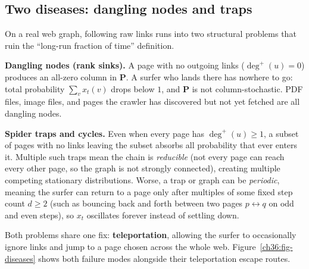 \subsection{Two diseases: dangling nodes and traps}

On a real web graph, following raw links runs into two structural problems that ruin the ``long-run fraction of time'' definition.

\begin{trapbox}
\textbf{Dangling nodes (rank sinks).} A page with no outgoing links ($\deg^+(u)=0$) produces an all-zero column in $\mathbf{P}$. A surfer who lands there has nowhere to go: total probability $\sum_v x_t(v)$ drops below $1$, and $\mathbf{P}$ is not column-stochastic. PDF files, image files, and pages the crawler has discovered but not yet fetched are all dangling nodes.

\textbf{Spider traps and cycles.} Even when every page has $\deg^+(u) \ge 1$, a subset of pages with no links leaving the subset absorbs all probability that ever enters it. Multiple such traps mean the chain is \emph{reducible} (not every page can reach every other page, so the graph is not strongly connected), creating multiple competing stationary distributions. Worse, a trap or graph can be \emph{periodic}, meaning the surfer can return to a page only after multiples of some fixed step count $d \ge 2$ (such as bouncing back and forth between two pages $p \leftrightarrow q$ on odd and even steps), so $x_t$ oscillates forever instead of settling down.
\end{trapbox}

Both problems share one fix: \textbf{teleportation}, allowing the surfer to occasionally ignore links and jump to a page chosen across the whole web. Figure~\ref{ch36:fig-diseases} shows both failure modes alongside their teleportation escape routes.

